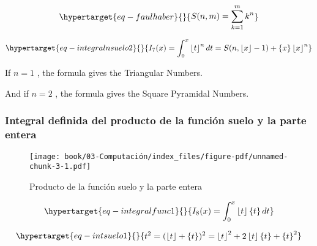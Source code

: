 \documentclass[
  letterpaper,
  DIV=11,
  numbers=noendperiod]{scrreprt}
\begin{document}
\begin{equation}\protect\hypertarget{eq-faulhaber}{}{
\begin{multline}
S(n,m)=\sum_{k=1}^{m}{k^n}
\end{multline}
}\label{eq-faulhaber}\end{equation}

\begin{equation}\protect\hypertarget{eq-integralnsuelo2}{}{
\begin{multline}
I_{7}(x) = \int_0^x \left\lfloor t \right\rfloor^n dt =
S(n, \left\lfloor x \right\rfloor - 1) +
\left\{ x \right\}\left\lfloor x \right\rfloor^n
\end{multline}
}\label{eq-integralnsuelo2}\end{equation}

If \(n=1\) , the formula gives the Triangular Numbers.

And if \(n=2\) , the formula gives the Square Pyramidal Numbers.

\hypertarget{integral-definida-del-producto-de-la-funciuxf3n-suelo-y-la-parte-entera}{%
\subsubsection{Integral definida del producto de la función suelo y la
parte
entera}\label{integral-definida-del-producto-de-la-funciuxf3n-suelo-y-la-parte-entera}}

\begin{figure}

{\centering \texttt{[image: book/03-Computación/index\_files/figure-pdf/unnamed-chunk-3-1.pdf]}

}

\caption{Producto de la función suelo y la parte entera}

\end{figure}

\begin{equation}\protect\hypertarget{eq-integralfunc1}{}{
\begin{multline}
I_{8}(x) = \int_0^x \left\lfloor t \right\rfloor \left\{ t \right\} dt
\end{multline}
}\label{eq-integralfunc1}\end{equation}

\begin{equation}\protect\hypertarget{eq-intsuelo1}{}{
\begin{multline}
t^2=(\left\lfloor t \right\rfloor + \left\{ t \right\})^2 =
{\left\lfloor t \right\rfloor}^{2} + 2 \left\lfloor t \right\rfloor \left\{ t \right\} + \left\{ t \right\}^2
\end{multline}
}\label{eq-intsuelo1}\end{equation}
\end{document}
